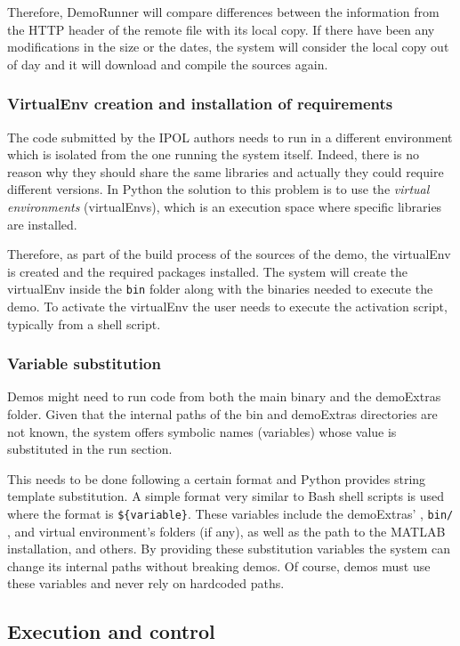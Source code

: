 Therefore, DemoRunner will compare differences between the information from the HTTP header of the remote file with its local copy. If there have been any modifications in the size or the dates, the system will consider the local copy out of day and it will download and compile the sources again. 


\subsubsection{VirtualEnv creation and installation of requirements}
\noindent

The code submitted by the IPOL authors needs to run in a different environment which is isolated from the one running the system itself. Indeed, there is no reason why they should share the same libraries and actually they could require different versions. In Python the solution to this problem is to use the \emph{virtual environments} (virtualEnvs), which is an execution space where specific libraries are installed.

Therefore, as part of the build process of the sources of the demo, the virtualEnv is created and the required packages installed.
%
The system will create the virtualEnv inside the {\tt bin} folder along with the binaries needed to execute the demo. To activate the virtualEnv the user needs to execute the activation script, typically from a shell script.


\subsubsection{Variable substitution}
Demos might need to run code from both the main binary and the demoExtras folder. Given that the internal paths of the bin and demoExtras directories are not known, the system offers symbolic names (variables) whose value is substituted in the run section.

This needs to be done following a certain format and Python provides string template substitution. A simple format very similar to Bash shell scripts is used where the format is {\tt \$\{variable\}}. These variables include the demoExtras' , {\tt bin/} , and virtual environment's folders (if any), as well as the path to the MATLAB installation, and others. By providing these substitution variables the system can change its internal paths without breaking demos. Of course, demos must use these variables and never rely on hardcoded paths.


\subsection{Execution and control}
\noindent

